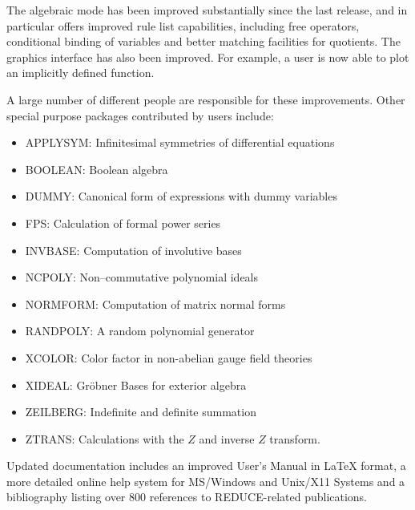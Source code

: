 The {\REDUCE} algebraic mode has been improved substantially since the
last release, and in particular offers improved rule list capabilities,
including free operators, conditional binding of variables and better
matching facilities for quotients.  The {\REDUCE} graphics interface has
also been improved.  For example, a user is now able to plot an implicitly
defined function.

A large number of different people are responsible for these improvements.
Other special purpose packages contributed by users include:

\begin{itemize}
\item {APPLYSYM: Infinitesimal symmetries of differential equations}

\item {BOOLEAN: Boolean algebra}

\item {DUMMY: Canonical form of expressions with dummy variables}

\item {FPS: Calculation of formal power series}

\item {INVBASE: Computation of involutive bases}

\item {NCPOLY: Non--commutative polynomial ideals}

\item {NORMFORM: Computation of matrix normal forms}

\item {RANDPOLY: A random polynomial generator}

\item {XCOLOR: Color factor in non-abelian gauge field theories}

\item {XIDEAL: Gr\"obner Bases for exterior algebra}

\item {ZEILBERG: Indefinite and definite summation}

\item{ZTRANS: Calculations with the $Z$ and inverse $Z$ transform.}
\end{itemize}

Updated documentation includes an improved User's Manual in {\LaTeX}
format, a more detailed online help system for MS/Windows and Unix/X11
Systems and a bibliography listing over 800 references to REDUCE-related
publications.

